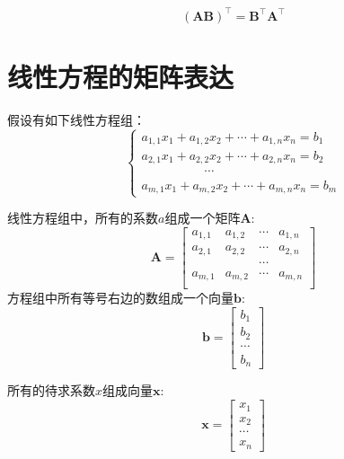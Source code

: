 \begin{equation}
  \bm{(AB)^\top = B^\top A^\top}
\end{equation}

\section{线性方程的矩阵表达}

假设有如下线性方程组：
\begin{equation}
  \label{eq:linear-equation}
  \begin{cases}
    a_{1,1}x_1 + a_{1,2}x_2 + \cdots + a_{1,n}x_n  =  b_1 \\
    a_{2,1}x_1 + a_{2,2}x_2 + \cdots + a_{2,n}x_n  =  b_2 \\
    \quad \quad \quad \quad \quad \cdots  \\ 
    a_{m,1}x_1 + a_{m,2}x_2 + \cdots + a_{m,n}x_n  =  b_m
  \end{cases}
\end{equation}

线性方程组中，所有的系数$a$组成一个矩阵$\bm{A}$:
\begin{equation}
  \bm{A} =
  \begin{bmatrix}
    a_{1,1} & a_{1,2} & \cdots & a_{1,n} \\
    a_{2,1} & a_{2,2} & \cdots & a_{2,n} \\
    & & \cdots \\
    a_{m,1} & a_{m,2} & \cdots & a_{m,n} \\
  \end{bmatrix}
\end{equation}
方程组中所有等号右边的数组成一个向量$\bm{b}$:
\begin{equation}
  \bm{b} =
  \begin{bmatrix}
    b_1 \\
    b_2 \\
    \cdots \\
    b_n
  \end{bmatrix}
\end{equation}

所有的待求系数$x$组成向量$\bm{x}$:
\begin{equation}
  \bm{x} =
  \begin{bmatrix}
    x_1 \\
    x_2 \\
    \cdots \\
    x_n
  \end{bmatrix}
\end{equation}

